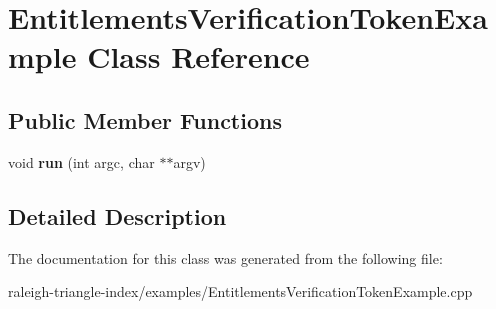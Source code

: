 \section{Entitlements\+Verification\+Token\+Example Class Reference}
\label{class_entitlements_verification_token_example}
\subsection*{Public Member Functions}
\begin{DoxyCompactItemize}
\item 
void {\bfseries run} (int argc, char $\ast$$\ast$argv)\label{class_entitlements_verification_token_example_a1cb918ca0adafb1b81b91d0f1a304cec}

\end{DoxyCompactItemize}


\subsection{Detailed Description}


The documentation for this class was generated from the following file\+:\begin{DoxyCompactItemize}
\item 
raleigh-\/triangle-\/index/examples/Entitlements\+Verification\+Token\+Example.\+cpp\end{DoxyCompactItemize}
